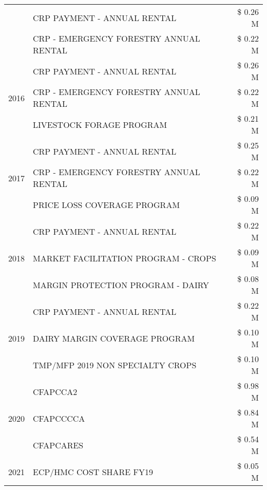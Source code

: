 \begin{tabular}{llr}
 & CRP PAYMENT - ANNUAL RENTAL & \$ 0.26 M \\
 & CRP - EMERGENCY FORESTRY ANNUAL RENTAL & \$ 0.22 M \\
\cline{1-3}
\multirow[t]{3}{*}{2016} & CRP PAYMENT - ANNUAL RENTAL & \$ 0.26 M \\
 & CRP - EMERGENCY FORESTRY ANNUAL RENTAL & \$ 0.22 M \\
 & LIVESTOCK FORAGE PROGRAM & \$ 0.21 M \\
\cline{1-3}
\multirow[t]{3}{*}{2017} & CRP PAYMENT - ANNUAL RENTAL & \$ 0.25 M \\
 & CRP - EMERGENCY FORESTRY ANNUAL RENTAL & \$ 0.22 M \\
 & PRICE LOSS COVERAGE PROGRAM & \$ 0.09 M \\
\cline{1-3}
\multirow[t]{3}{*}{2018} & CRP PAYMENT - ANNUAL RENTAL & \$ 0.22 M \\
 & MARKET FACILITATION PROGRAM - CROPS & \$ 0.09 M \\
 & MARGIN PROTECTION PROGRAM - DAIRY & \$ 0.08 M \\
\cline{1-3}
\multirow[t]{3}{*}{2019} & CRP PAYMENT - ANNUAL RENTAL & \$ 0.22 M \\
 & DAIRY MARGIN COVERAGE PROGRAM & \$ 0.10 M \\
 & TMP/MFP 2019 NON SPECIALTY CROPS & \$ 0.10 M \\
\cline{1-3}
\multirow[t]{3}{*}{2020} & CFAPCCA2 & \$ 0.98 M \\
 & CFAPCCCCA & \$ 0.84 M \\
 & CFAPCARES & \$ 0.54 M \\
\cline{1-3}
2021 & ECP/HMC COST SHARE FY19 & \$ 0.05 M \\
\cline{1-3}
\bottomrule
\end{tabular}
